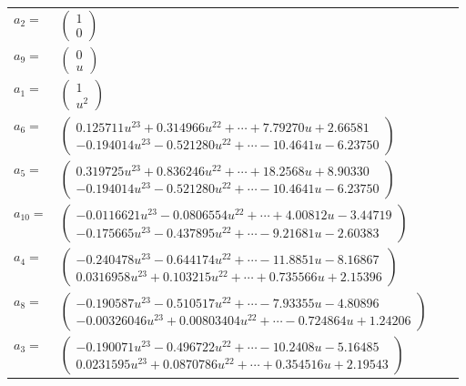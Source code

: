 \documentclass[1p]{elsarticle_modified}
\theoremstyle{definition}
\begin{document}
\begin{tabular}{m{7pt} m{180pt} m{7pt} m{180pt} }
\flushright $a_{2}=$&$\begin{pmatrix}1\\0\end{pmatrix}$ \\
\flushright $a_{9}=$&$\begin{pmatrix}0\\u\end{pmatrix}$ \\
\flushright $a_{1}=$&$\begin{pmatrix}1\\u^2\end{pmatrix}$ \\
\flushright $a_{6}=$&$\begin{pmatrix}0.125711 u^{23}+0.314966 u^{22}+\cdots+7.79270 u+2.66581\\-0.194014 u^{23}-0.521280 u^{22}+\cdots-10.4641 u-6.23750\end{pmatrix}$ \\
\flushright $a_{5}=$&$\begin{pmatrix}0.319725 u^{23}+0.836246 u^{22}+\cdots+18.2568 u+8.90330\\-0.194014 u^{23}-0.521280 u^{22}+\cdots-10.4641 u-6.23750\end{pmatrix}$ \\
\flushright $a_{10}=$&$\begin{pmatrix}-0.0116621 u^{23}-0.0806554 u^{22}+\cdots+4.00812 u-3.44719\\-0.175665 u^{23}-0.437895 u^{22}+\cdots-9.21681 u-2.60383\end{pmatrix}$ \\
\flushright $a_{4}=$&$\begin{pmatrix}-0.240478 u^{23}-0.644174 u^{22}+\cdots-11.8851 u-8.16867\\0.0316958 u^{23}+0.103215 u^{22}+\cdots+0.735566 u+2.15396\end{pmatrix}$ \\
\flushright $a_{8}=$&$\begin{pmatrix}-0.190587 u^{23}-0.510517 u^{22}+\cdots-7.93355 u-4.80896\\-0.00326046 u^{23}+0.00803404 u^{22}+\cdots-0.724864 u+1.24206\end{pmatrix}$ \\
\flushright $a_{3}=$&$\begin{pmatrix}-0.190071 u^{23}-0.496722 u^{22}+\cdots-10.2408 u-5.16485\\0.0231595 u^{23}+0.0870786 u^{22}+\cdots+0.354516 u+2.19543\end{pmatrix}$ \\

\end{tabular}
\end{document}
